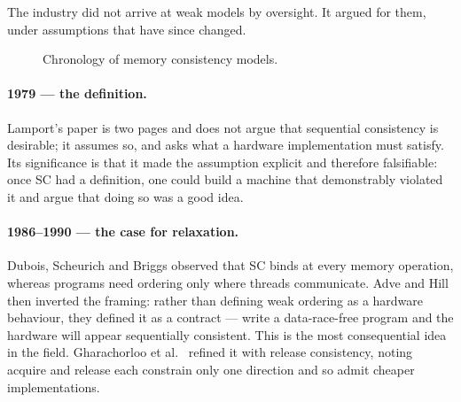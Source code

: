 The industry did not arrive at weak models by oversight.
It argued for them, under assumptions that have since changed.

\begin{figure}[H]
\centering
{}
\caption{Chronology of memory consistency models.}
\label{fig:d1-timeline}
\end{figure}

\paragraph{1979 --- the definition.}
Lamport's paper \cite{lamport1979multiprocessor} is two pages and does not argue
that sequential consistency is desirable; it assumes so, and asks what a
hardware implementation must satisfy.
Its significance is that it made the assumption explicit and therefore
falsifiable: once SC had a definition, one could build a machine that
demonstrably violated it and argue that doing so was a good idea.

\paragraph{1986--1990 --- the case for relaxation.}
Dubois, Scheurich and Briggs \cite{dubois1986memory} observed that SC binds at
every memory operation, whereas programs need ordering only where threads
communicate.
Adve and Hill \cite{adve1990weak} then inverted the framing: rather than
defining weak ordering as a hardware behaviour, they defined it as a contract
--- write a data-race-free program and the hardware will appear sequentially
consistent.
This is the most consequential idea in the field.
Gharachorloo et al.\ \cite{gharachorloo1990memory} refined it with release
consistency, noting acquire and release each constrain only one direction and so
admit cheaper implementations.

